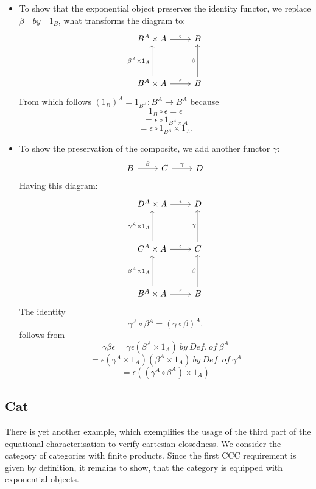 \begin{itemize}
  \begin{itemize}
  \item To show that the exponential object preserves the identity functor, we replace $\beta \quad by \quad 1_B$, what transforms the diagram to:
    \[
\begin{tikzcd}[row sep=huge]
    B^A \times A \arrow{r}{\epsilon} & B \\
    B^A \times A \arrow{u}{\beta^A \times 1_A} \arrow{r}{\epsilon} & B \arrow{u}{\beta}
  \end{tikzcd}
\]
From which follows $(1_B)^A = 1_{B^A} : B^A \to B^A$ because
$$ 1_B \circ \epsilon = \epsilon$$
$$ = \epsilon \circ 1_{B^A \times A}$$
$$ = \epsilon \circ 1_{B^A} \times 1_A.$$
\item To show the preservation of the composite, we add another functor $\gamma$:
  \[
  \begin{tikzcd}[row sep=huge]
    B \arrow{r}{\beta} & C \arrow{r}{\gamma} & D
  \end{tikzcd}
  \]
  Having this diagram:
  \[
  \begin{tikzcd}[row sep=huge]
    D^A \times A \arrow{r}{\epsilon} & D \\
    C^A \times A \arrow{u}{\gamma^A \times 1_A} \arrow{r}{\epsilon} & C \arrow{u}{\gamma} \\
    B^A \times A \arrow{u}{\beta^A \times 1_A} \arrow{r}{\epsilon} & B \arrow{u}{\beta}
  \end{tikzcd}
  \]
  The identity
  $$\gamma^A \circ \beta^A = (\gamma \circ \beta)^A. $$ follows from
  $$\gamma \beta \epsilon = \gamma \epsilon (\beta^A \times 1_A) \ by \ Def. \ of \ \beta^A$$
  $$=\epsilon (\gamma^A \times 1_A)(\beta^A \times 1_A) \ by \ Def. \ of \ \gamma^A$$
  $$=\epsilon ((\gamma^A \circ \beta^A) \times 1_A)$$


  \end{itemize}
\end{itemize}


\subsection{\textbf{Cat}}
There is yet another example, which exemplifies the usage of the third part of the equational characterisation to verify cartesian closedness.
We consider the category of categories with finite products.
Since the first CCC requirement is given by definition, it remains to show, that the category is equipped with exponential objects. 

